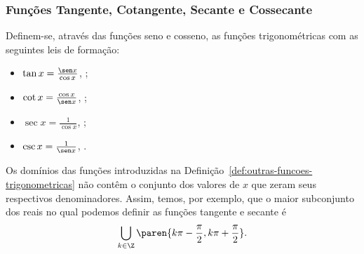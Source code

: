 \subsubsection{Funções Tangente, Cotangente, Secante e Cossecante}

\begin{definition}
\label{def:outras-funcoes-trigonometricas}
    Definem-se, através das funções seno e cosseno, as funções
trigonométricas com as seguintes leis de formação:
\begin{itemize}
  \item $\tan x = \frac {\sen x}{\cos x}$, ;
  \item $\cot x = \frac {\cos x}{\sen x}$, ;
  \item $\sec x = \frac {1}{\cos x}$, ;
  \item $\csc x = \frac {1}{\sen x}$, .
\end{itemize}
\end{definition}

\begin{remark}
    Os domínios das funções introduzidas na Definição~\ref{def:outras-funcoes-trigonometricas} não contêm o conjunto dos valores de $x$
que zeram seus respectivos denominadores. Assim, temos, por exemplo, que o maior subconjunto dos reais no qual podemos definir
as funções tangente e secante é $$\bigcup_{k \in \Z} \paren{k \pi -
\frac {\pi} 2, k \pi + \frac {\pi} 2}.$$
\end{remark}